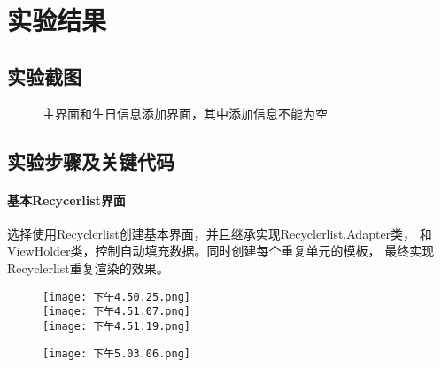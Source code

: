 \documentclass[UTF8]{ctexart}
\begin{document}
\section{实验结果}
	\subsection{实验截图}
	\begin{figure}[H]
	\centering
	\caption{主界面和生日信息添加界面，其中添加信息不能为空}
	\end{figure}
	
	\subsection{实验步骤及关键代码}
		\paragraph{基本Recycerlist界面}
		选择使用Recyclerlist创建基本界面，并且继承实现Recyclerlist.Adapter类，
		和ViewHolder类，控制自动填充数据。同时创建每个重复单元的模板，
		最终实现Recyclerlist重复渲染的效果。
		\begin{figure}[H]
		\centering
			\begin{minipage}{.8\textwidth}
			\texttt{[image: 下午4.50.25.png]}\\
			\texttt{[image: 下午4.51.07.png]}\\
			\texttt{[image: 下午4.51.19.png]}
			\end{minipage}
		\end{figure}
		\begin{figure}[H]
		\centering
			\begin{minipage}{.8\textwidth}
			\texttt{[image: 下午5.03.06.png]}
			\end{minipage}
		\end{figure}
			
\end{document}
